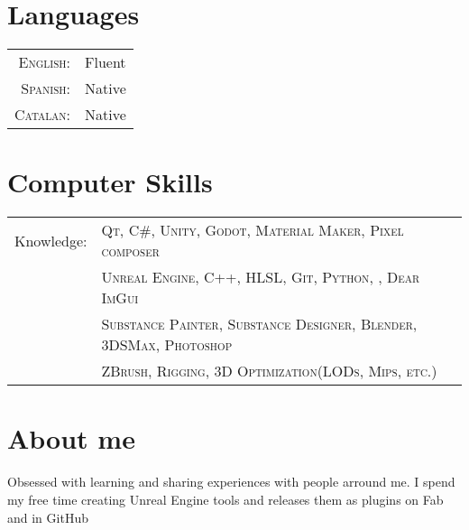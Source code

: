 \documentclass[a4paper,10pt]{article} %
\begin{document}

\section{Languages}

\begin{tabular}{rl}
\textsc{English:} & Fluent\\

\textsc{Spanish:} & Native\\

\textsc{Catalan:} & Native\\
\end{tabular}


\section{Computer Skills}

\begin{tabular}{rl}
Knowledge: & \textsc{Qt}, \textsc{C\#}, \textsc{Unity}, \textsc{Godot}, \textsc{Material Maker}, \textsc{Pixel composer}\\
& \textsc{Unreal Engine}, \textsc{C++}, \textsc{HLSL}, \textsc{Git}, \textsc{Python}, , \textsc{Dear ImGui}\\
& \textsc{Substance Painter}, \textsc{Substance Designer}, \textsc{Blender}, \textsc{3DSMax}, \textsc{Photoshop}\\
& \textsc{ZBrush}, \textsc{Rigging}, \textsc{3D Optimization(LODs, Mips, etc.)} \\
\end{tabular}


\section{About me}

Obsessed with learning and sharing experiences with people arround me. I spend my free time creating Unreal Engine tools and releases them as plugins on Fab and in GitHub
\end{document}
